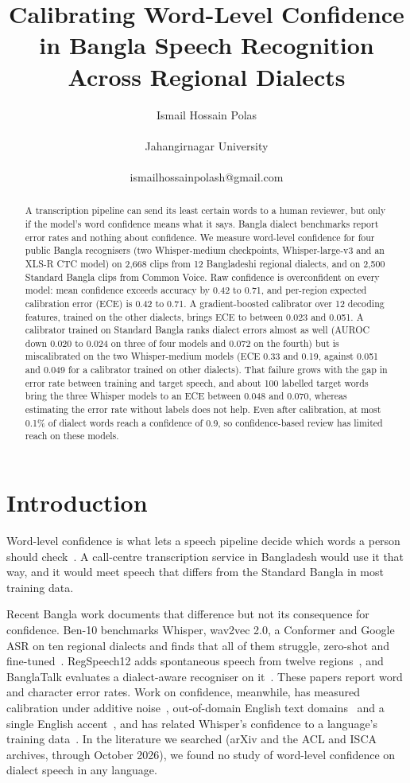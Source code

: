 \documentclass[10pt]{article}
\title{Calibrating Word-Level Confidence in Bangla Speech Recognition Across Regional Dialects}
\author{Ismail Hossain Polas \\\\ Jahangirnagar University \\\\ ismailhossainpolash@gmail.com}
\date{}
\begin{document}
\maketitle
\begin{abstract}

A transcription pipeline can send its least certain words to a human reviewer, but only if the model's word confidence means what it says. Bangla dialect benchmarks report error rates and nothing about confidence. We measure word-level confidence for four public Bangla recognisers (two Whisper-medium checkpoints, Whisper-large-v3 and an XLS-R CTC model) on 2,668 clips from 12 Bangladeshi regional dialects, and on 2,500 Standard Bangla clips from Common Voice. Raw confidence is overconfident on every model: mean confidence exceeds accuracy by 0.42 to 0.71, and per-region expected calibration error (ECE) is 0.42 to 0.71. A gradient-boosted calibrator over 12 decoding features, trained on the other dialects, brings ECE to between 0.023 and 0.051. A calibrator trained on Standard Bangla ranks dialect errors almost as well (AUROC down 0.020 to 0.024 on three of four models and 0.072 on the fourth) but is miscalibrated on the two Whisper-medium models (ECE 0.33 and 0.19, against 0.051 and 0.049 for a calibrator trained on other dialects). That failure grows with the gap in error rate between training and target speech, and about 100 labelled target words bring the three Whisper models to an ECE between 0.048 and 0.070, whereas estimating the error rate without labels does not help. Even after calibration, at most 0.1\% of dialect words reach a confidence of 0.9, so confidence-based review has limited reach on these models.


\end{abstract}

\section{Introduction}

Word-level confidence is what lets a speech pipeline decide which words a person should check~\cite{Oneata2021,Qiu2021}. A call-centre transcription service in Bangladesh would use it that way, and it would meet speech that differs from the Standard Bangla in most training data.


Recent Bangla work documents that difference but not its consequence for confidence. Ben-10 benchmarks Whisper, wav2vec 2.0, a Conformer and Google ASR on ten regional dialects and finds that all of them struggle, zero-shot and fine-tuned~\cite{Dipto2025}. RegSpeech12 adds spontaneous speech from twelve regions~\cite{Hassan2025}, and BanglaTalk evaluates a dialect-aware recogniser on it~\cite{Hasan2025}. These papers report word and character error rates. Work on confidence, meanwhile, has measured calibration under additive noise~\cite{Huo2025}, out-of-domain English text domains~\cite{Li2022} and a single English accent~\cite{Jia2026}, and has related Whisper's confidence to a language's training data~\cite{Liang2025}. In the literature we searched (arXiv and the ACL and ISCA archives, through October 2026), we found no study of word-level confidence on dialect speech in any language.
\end{document}
